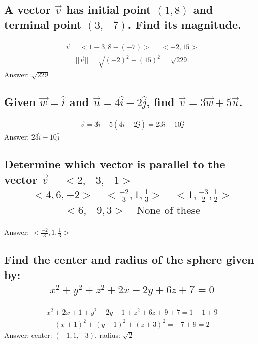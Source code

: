 \documentclass{article}
\begin{document}
\subsection{A vector $\vec{v}$ has initial point $(1, 8)$ and terminal point $(3, -7)$. Find its magnitude.}
\begin{align*}
	\vec{v} = <1 - 3, 8 - (-7)> = <-2, 15>
\end{align*}
\begin{align*}
	|| \vec{v} || = \sqrt{(-2)^2 + (15)^2} = \sqrt{229}
\end{align*}
Answer: $\sqrt{229}$

\subsection{Given $\vec{w} = \hat{i}$ and $\vec{u} = 4\hat{i} - 2\hat{j}$, find $\vec{v} = 3\vec{w} + 5\vec{u}$.}
\begin{align*}
	\vec{v} = 3\hat{i} + 5(4\hat{i} - 2\hat{j}) = 23\hat{i} - 10\hat{j}
\end{align*}
Answer: $23\hat{i} - 10\hat{j}$

\subsection{Determine which vector is parallel to the vector $\vec{v} = <2, -3, -1>$
	\begin{align*}
		<4, 6, -2> \quad <\frac{-2}{3}, 1, \frac{1}{3}> \quad <1, \frac{-3}{2}, \frac{1}{2}>
	\end{align*}
	\begin{align*}
		<6, -9, 3> \quad \text{None of these}
	\end{align*}
}
Answer: $<\frac{-2}{3}, 1, \frac{1}{3}>$

\subsection{Find the center and radius of the sphere given by:
	\begin{align*}
		x^2 + y^2 + z^2 + 2x - 2y + 6z + 7 = 0
	\end{align*}
}
\begin{align*}
	x^2 + 2x + 1 + y^2 - 2y + 1 + z^2 + 6z + 9 + 7 = 1 -1 + 9
\end{align*}
\begin{align*}
	(x +1)^2 +(y - 1)^2 + (z + 3)^2 = -7 + 9 = 2
\end{align*}
Answer: center: $(-1, 1, -3)$, radius: $\sqrt{2}$
\end{document}
